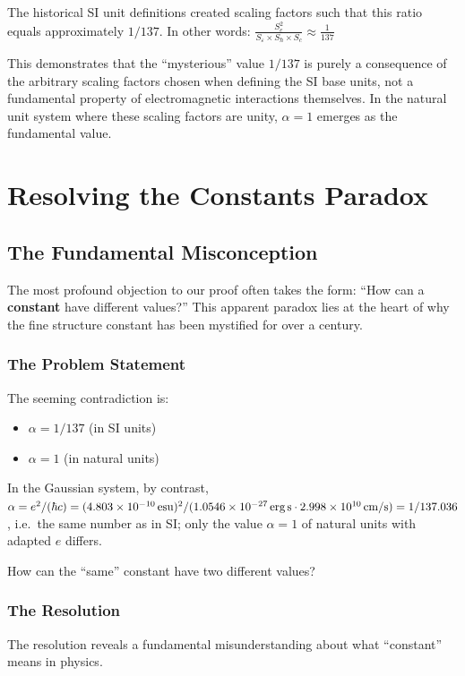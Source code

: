 	The historical SI unit definitions created scaling factors such that this ratio equals approximately $1/137$. In other words:
	$\frac{S_e^2}{S_{\varepsilon} \times S_{\hbar} \times S_c} \approx \frac{1}{137}$
	
	This demonstrates that the ``mysterious'' value $1/137$ is purely a consequence of the arbitrary scaling factors chosen when defining the SI base units, not a fundamental property of electromagnetic interactions themselves. In the natural unit system where these scaling factors are unity, $\alpha = 1$ emerges as the fundamental value.
	
\section{Resolving the Constants Paradox}

\subsection{The Fundamental Misconception}

The most profound objection to our proof often takes the form: ``How can a \textbf{constant} have different values?'' This apparent paradox lies at the heart of why the fine structure constant has been mystified for over a century.

\subsubsection{The Problem Statement}

The seeming contradiction is:
\begin{itemize}
	\item $\alpha = 1/137$ (in SI units)
	\item $\alpha = 1$ (in natural units)
\end{itemize}
In the Gaussian system, by contrast, $\alpha=e^2/(\hbar c)=(4.803\times10^{-10}\,\text{esu})^2/(1.0546\times10^{-27}\,\text{erg\,s}\cdot2.998\times10^{10}\,\text{cm/s})=1/137.036$, i.e.\ the same number as in SI; only the value $\alpha=1$ of natural units with adapted $e$ differs.

How can the ``same'' constant have two different values?

\subsubsection{The Resolution}

The resolution reveals a fundamental misunderstanding about what ``constant'' means in physics.

